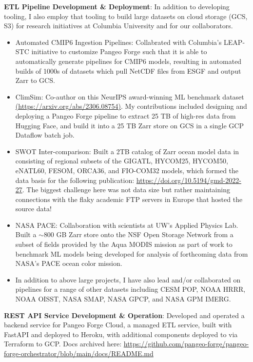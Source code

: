 \documentclass[letterpaper,11pt]{article}
\newcommand{\resumeItem}[2]{
  \item[]\small{
    \textbf{#1}{: #2 \vspace{-2pt}}
  }
}
\begin{document}
        \resumeItem{ETL Pipeline Development \& Deployment}
          {In addition to developing tooling, I also employ that tooling to build large
          datasets on cloud storage (GCS, S3) for research initiatives at Columbia University and for our collaborators.}
          \begin{itemize}
            \item Automated CMIP6 Ingestion Pipelines: Collabrated with Columbia's LEAP-STC initiative to
            customize Pangeo Forge such that it is able to automatically generate pipelines for CMIP6 models,
            resulting in automated builds of 1000s of datasets which pull NetCDF files from ESGF and output Zarr to GCS.
            \item ClimSim: Co-author on this NeurIPS award-winning ML benchmark dataset
            \href{https://arxiv.org/abs/2306.08754}{(https://arxiv.org/abs/2306.08754)}.
            My contributions included designing and deploying a Pangeo Forge pipeline to extract 25 TB of high-res data
            from Hugging Face, and build it into a 25 TB Zarr store on GCS in a single GCP Dataflow batch job.
            \item SWOT Inter-comparison: Built a 2TB catalog of Zarr ocean model data in consisting of
            regional subsets of the GIGATL, HYCOM25, HYCOM50, eNATL60, FESOM, ORCA36, and FIO-COM32 models,
            which formed the data basis for the following publication: \href{https://doi.org/10.5194/gmd-2022-27}{https://doi.org/10.5194/gmd-2022-27}.
            The biggest challenge here was not data size but rather maintaining connections with the flaky academic FTP servers in Europe
            that hosted the source data!
            \item NASA PACE: Collaboration with scientists at UW's Applied Physics Lab.
            Built a $\sim$800 GB Zarr store onto the NSF Open Storage Network from a subset of fields provided by the Aqua MODIS mission
            as part of work to benchmark ML models being developed for analysis of forthcoming data from
            NASA's PACE ocean color mission.
            \item In addition to above large projects, I have also lead and/or collaborated on pipelines for a range of other datasets
            including CESM POP, NOAA HRRR, NOAA OISST, NASA SMAP, NASA GPCP, and NASA GPM IMERG.
          \end{itemize}
        \resumeItem{REST API Service Development \& Operation}
          {Developed and operated a backend service for Pangeo Forge Cloud,
          a managed ETL service, built with FastAPI and deployed to Heroku,
          with additional components deployed to via Terraform to GCP.
          Docs archived here: \href{https://github.com/pangeo-forge/pangeo-forge-orchestrator/blob/main/docs/README.md}
          {https://github.com/pangeo-forge/pangeo-forge-orchestrator/blob/main/docs/README.md}
          }
\end{document}
